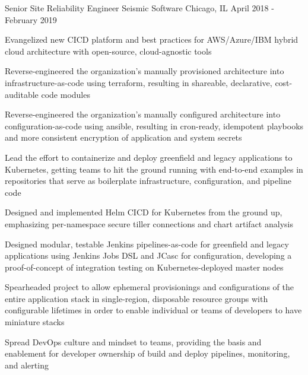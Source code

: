 

\begin{cventries}

  \cventry
    {Senior Site Reliability Engineer} %
    {Seismic Software} %
    {Chicago, IL} %
    {April 2018 - February 2019} %
    {
      \begin{cvitems} %
        \item {Evangelized new CICD platform and best practices for AWS/Azure/IBM hybrid cloud architecture with open-source, cloud-agnostic tools}
        \item {Reverse-engineered the organization's manually provisioned architecture into infrastructure-as-code using terraform, resulting in shareable, declarative, cost-auditable code modules}
        \item {Reverse-engineered the organization's manually configured architecture into configuration-as-code using ansible, resulting in cron-ready, idempotent playbooks and more consistent encryption of application and system secrets}
        \item {Lead the effort to containerize and deploy greenfield and legacy applications to Kubernetes, getting teams to hit the ground running with end-to-end examples in repositories that serve as boilerplate infrastructure, configuration, and pipeline code}
        \item {Designed and implemented Helm CICD for Kubernetes from the ground up, emphasizing per-namespace secure tiller connections and chart artifact analysis}
        \item {Designed modular, testable Jenkins pipelines-as-code for greenfield and legacy applications using Jenkins Jobs DSL and JCasc for configuration, developing a proof-of-concept of integration testing on Kubernetes-deployed master nodes}
        \item {Spearheaded project to allow ephemeral provisionings and configurations of the entire application stack in single-region, disposable resource groups with configurable lifetimes in order to enable individual or teams of developers to have miniature stacks}
        \item {Spread DevOps culture and mindset to teams, providing the basis and enablement for developer ownership of build and deploy pipelines, monitoring, and alerting}
      \end{cvitems}
    }


\end{cventries}
